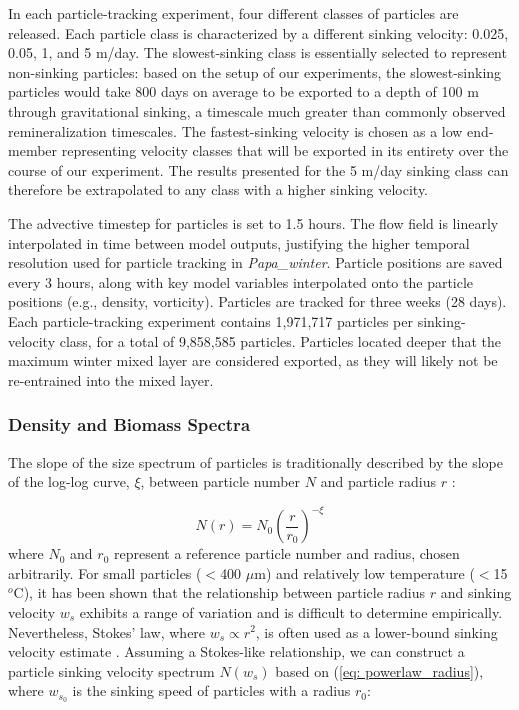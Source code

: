 \documentclass[draft,linenumbers]{agujournal2018}
\begin{document}
In each particle-tracking experiment, four different classes of particles are released. Each particle class is characterized by a different sinking velocity: 0.025, 0.05, 1, and 5 m/day. The slowest-sinking class is essentially selected to represent non-sinking particles: based on the setup of our experiments, the slowest-sinking particles would take 800 days on average to be exported to a depth of 100 m through gravitational sinking, a timescale much greater than commonly observed remineralization timescales. The fastest-sinking velocity is chosen as a low end-member representing velocity classes that will be exported in its entirety over the course of our experiment. The results presented for the 5 m/day sinking class can therefore be extrapolated to any class with a higher sinking velocity.

The advective timestep for particles is set to 1.5 hours. The flow field is linearly interpolated in time between model outputs, justifying the higher temporal resolution used for particle tracking in \textit{Papa\_winter}. Particle positions are saved every 3 hours, along with key model variables interpolated onto the particle positions (e.g., density, vorticity). Particles are tracked for three weeks (28 days). Each particle-tracking experiment contains 1,971,717 particles per sinking-velocity class, for a total of 9,858,585 particles. Particles located deeper that the maximum winter mixed layer \citep[i.e., 100 m;][]{Pelland_2016, Plant_2016} are considered exported, as they will likely not be re-entrained into the mixed layer. %

\subsubsection{Density and Biomass Spectra}
\label{sec: equations_biomass}
The slope of the size spectrum of particles is traditionally described by the slope of the log-log curve, $\xi$, between particle number $N$ and particle radius $r$ \citep[also know as the Junge slope;][]{White_2015}:

\begin{equation}
N(r) = N_0 \left(\frac{r}{r_0}\right)^{-\xi}
\label{eq: powerlaw_radius}
\end{equation}
where $N_0$ and $r_0$ represent a reference particle number and radius, chosen arbitrarily. For small particles ($<$400 $\mu$m) and relatively low temperature ($<$15$^o$C), it has been shown that the relationship between particle radius $r$ and sinking velocity $w_s$ exhibits a range of variation and is difficult to determine empirically. Nevertheless, Stokes' law, where $w_s \propto r^2$, is often used as a lower-bound sinking velocity estimate \citep{Bach_2012}. %
Assuming a Stokes-like relationship, we can construct a particle sinking velocity spectrum $N(w_s)$ based on (\ref{eq: powerlaw_radius}), where $w_{s_0}$ is the sinking speed of particles with a radius $r_0$:
\end{document}
